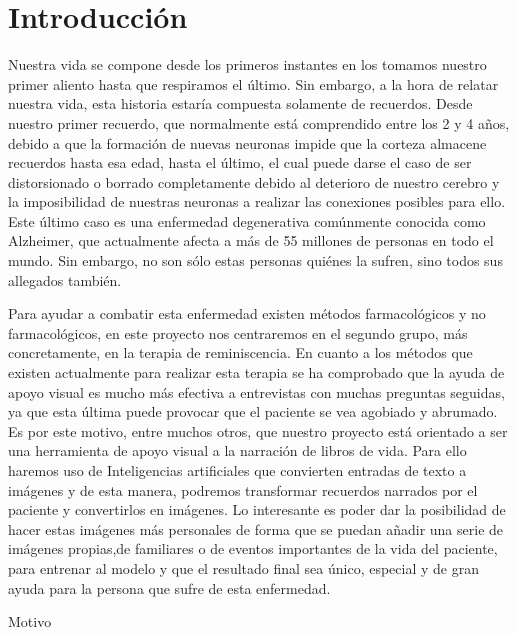 \chapter{Introducción}
\label{cap:introduccion}


Nuestra vida se compone desde los primeros instantes en los tomamos nuestro primer aliento hasta que respiramos el último. Sin embargo, a la hora de relatar nuestra vida, esta historia estaría compuesta solamente de recuerdos. Desde nuestro primer recuerdo, que normalmente está comprendido entre los 2 y 4 años, debido a que la formación de nuevas neuronas impide que la corteza almacene recuerdos hasta esa edad, hasta el último, el cual puede darse el caso de ser distorsionado o borrado completamente debido al deterioro de nuestro cerebro y la imposibilidad de nuestras neuronas a realizar las conexiones posibles para ello. Este último caso es una enfermedad degenerativa comúnmente conocida como Alzheimer, que actualmente afecta a más de 55 millones de personas en todo el mundo. Sin embargo, no son sólo estas personas quiénes la sufren, sino todos sus allegados también. 


Para ayudar a combatir esta enfermedad existen métodos farmacológicos y no farmacológicos, en este proyecto nos centraremos en el segundo grupo, más concretamente, en la terapia de reminiscencia. En cuanto a los métodos que existen actualmente para realizar esta terapia se ha comprobado que la ayuda de apoyo visual es mucho más efectiva a entrevistas con muchas preguntas seguidas, ya que esta última puede provocar que el paciente se vea agobiado y abrumado. Es por este motivo, entre muchos otros, que nuestro proyecto está orientado a ser una herramienta de apoyo visual a la narración de libros de vida. Para ello haremos uso de Inteligencias artificiales que convierten entradas de texto a imágenes y de esta manera, podremos transformar recuerdos narrados por el paciente y convertirlos en imágenes. Lo interesante es poder dar la posibilidad de hacer estas imágenes más personales de forma que se puedan añadir una serie de imágenes propias,de familiares o de eventos importantes de la vida del paciente, para entrenar al modelo y que el resultado final sea único, especial y de gran ayuda para la persona que sufre de esta enfermedad. 

Motivo\\

